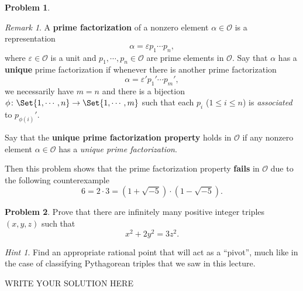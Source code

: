 \documentclass[11pt]{article}
\theoremstyle{plain}
\theoremstyle{definition}
\newtheorem{problem}{Problem}
\theoremstyle{remark}
\newtheorem*{remark}{Remark}
\newtheorem*{hint}{Hint}
\numberwithin{equation}{problem}
\begin{document}
\begin{problem}
\begin{listinprob}
	\end{listinprob}
	\begin{remark}
		A \textbf{prime factorization} of a nonzero element $\alpha\in\mathscr{O}$ is a representation
		\[
			\alpha = \varepsilon p_1\cdots p_n,	
		\]
		where $\varepsilon\in\mathscr{O}$ is a unit and $p_1,\cdots,p_n\in\mathscr{O}$ are prime elements in $\mathscr{O}$. 
		Say that $\alpha$ has a \textbf{unique} prime factorization if whenever there is another prime factorization
		\[
			\alpha = \varepsilon' p_1'\cdots p_m', 
		\]
		we necessarily have $m=n$ and there is a bijection $\phi\colon\Set{1,\cdots,n}\to\Set{1,\cdots,m}$ such that each $p_i$ ($1\le i\le n$) is \emph{associated} to $p_{\phi(i)}'$.

		Say that the \textbf{unique prime factorization property} holds in $\mathscr{O}$ if any nonzero element $\alpha\in\mathscr{O}$ has a \emph{unique prime factorization}. 

		Then this problem shows that the prime factorization property \textbf{fails} in $\mathscr{O}$ due to the following counterexample
		\[
			6 = 2\cdot 3 = (1+\sqrt{-5})\cdot(1-\sqrt{-5}).
		\]
	\end{remark}
\end{problem}


\begin{problem}
	Prove that there are infinitely many positive integer triples $(x,y,z)$ such that 
	\[
		x^2 + 2y^2 = 3z^2.
	\]
	\begin{hint}
		Find an appropriate rational point that will act as a ``pivot'', much like in the case of classifying Pythagorean triples that we saw in this lecture.
	\end{hint}
\begin{solution} %
WRITE YOUR SOLUTION HERE
\end{solution}\clearpage %
\end{problem}
\end{document}
